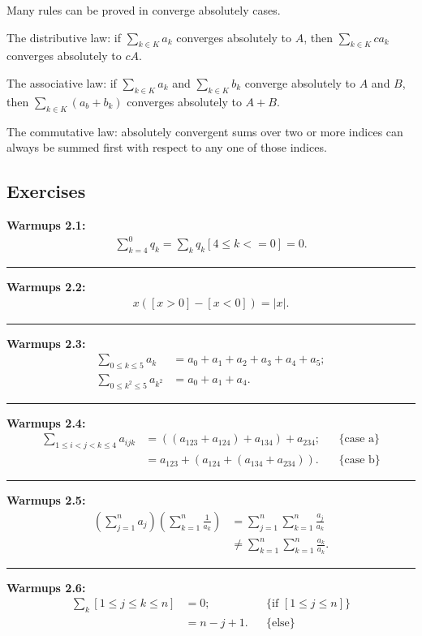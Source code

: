 \documentclass{article}
\begin{document}
Many rules can be proved in converge absolutely cases.


The distributive law: if $\sum_{k \in K} a_k$ converges absolutely to $A$, then $\sum_{k \in K} ca_k$ converges absolutely to $cA$.


The associative law: if $\sum_{k \in K} a_k$ and $\sum_{k \in K} b_k$ converge absolutely to $A$ and $B$, then $\sum_{k \in K} (a _b + b_k)$ converges absolutely to $A+B$.


The commutative law: absolutely convergent sums over two or more indices can always be summed first with respect to any one of those indices.

\subsection{Exercises}
\textbf{Warmups 2.1:} 
\begin{align}
\sum_{k=4}^0 q_k = \sum_{k} q_k[4 \le k <= 0] = 0.
\end{align}

\noindent\rule{\textwidth}{0.4pt}
\textbf{Warmups 2.2:}
\begin{align}
x([x>0]-[x<0]) = |x|.
\end{align}

\noindent\rule{\textwidth}{0.4pt}
\textbf{Warmups 2.3:}
\begin{align}
\sum_{0 \le k \le 5} a_k &= a_0 + a_1 + a_2 + a_3 + a_4 + a_5;\\
\sum_{0 \le k^2 \le 5} a_{k^2} &= a_0 + a_1 + a_4.
\end{align}

\noindent\rule{\textwidth}{0.4pt}
\textbf{Warmups 2.4:}
\begin{align}
\sum_{1 \le i < j < k \le 4} a_{ijk} &= ((a_{123} + a_{124}) + a_{134}) + a_{234}; && \{\text{case a}\} \\
				     &= a_{123} + (a_{124} + (a_{134} + a_{234})). && \{\text{case b}\}
\end{align}

\noindent\rule{\textwidth}{0.4pt}
\textbf{Warmups 2.5:}
\begin{align}
(\sum_{j=1}^n a_j) (\sum_{k=1}^n \frac{1}{a_k}) &= \sum_{j=1}^n \sum_{k=1}^n \frac{a_j}{a_k}\\
						&\neq \sum_{k=1}^n \sum_{k=1}^n \frac{a_k}{a_k}.
\end{align}

\noindent\rule{\textwidth}{0.4pt}
\textbf{Warmups 2.6:}
\begin{align}
\sum_{k}[1\le j\le k \le n] &= 0; && \{\text{if } [1 \le j \le n]\}\\
			    &= n-j+1. && \{\text{else}\}
\end{align}
\end{document}
